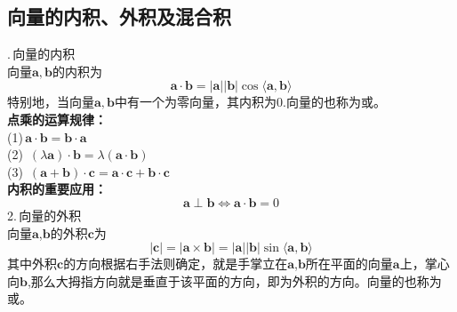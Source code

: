 \subsection{向量的内积、外积及混合积}
.$\,$向量的内积\\

\vspace*{-1em}\vspace*{-1em}
向量$\boldsymbol{a},\boldsymbol{b}$的内积为
\begin{equation}
	\boldsymbol{a}\cdot\boldsymbol{b}=|\boldsymbol{a}||\boldsymbol{b}|\cos\langle\boldsymbol{a},\boldsymbol{b}\rangle
\end{equation}
特别地，当向量$\boldsymbol{a},\boldsymbol{b}$中有一个为零向量，其内积为0.向量的也称为或。\\
\textbf{点乘的运算规律：}\\
(1)$\,$\qquad $\boldsymbol{a}\cdot\boldsymbol{b}=\boldsymbol{b}\cdot\boldsymbol{a}$\\
(2)$\,$\qquad
$(\lambda\boldsymbol{a})\cdot\boldsymbol{b}=\lambda(\boldsymbol{a}\cdot\boldsymbol{b})$\\
(3)$\,$\qquad
$(\boldsymbol{a}+\boldsymbol{b})\cdot\boldsymbol{c}=\boldsymbol{a}\cdot\boldsymbol{c}+\boldsymbol{b}\cdot\boldsymbol{c}$\\
\textbf{内积的重要应用：}
\begin{equation}
	\boldsymbol{a}\perp\boldsymbol{b}\Leftrightarrow \boldsymbol{a}\cdot\boldsymbol{b}=0 
\end{equation}
2.$\,$向量的外积\\

\vspace*{-1em}\vspace*{-1em}
向量$\boldsymbol{a}$,$\boldsymbol{b}$的外积$\boldsymbol{c}$为
\begin{equation}
	|\boldsymbol{c}|=|\boldsymbol{a}\times\boldsymbol{b}|=|\boldsymbol{a}||\boldsymbol{b}|\sin\langle\boldsymbol{a},\boldsymbol{b}\rangle
\end{equation}
其中外积$\boldsymbol{c}$的方向根据右手法则确定，就是手掌立在$\boldsymbol{a}$,$\boldsymbol{b}$所在平面的向量$\boldsymbol{a}$上，掌心向$\boldsymbol{b}$,那么大拇指方向就是垂直于该平面的方向，即为外积的方向。向量的也称为或。\\

